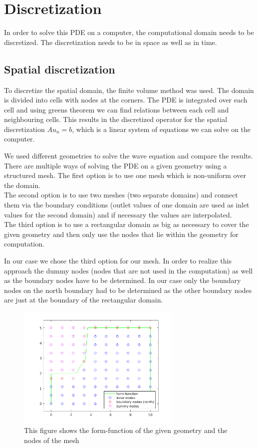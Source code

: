 \documentclass[fleqn,12pt]{NTFD} %
\begin{document}

\section{Discretization}
In order to solve this PDE on a computer, the computational domain needs to be discretized. The discretization needs to be in space as well as in time.
\subsection{Spatial discretization}
To discretize the spatial domain, the finite volume method was used. The domain is divided into cells with nodes at the corners. The PDE is integrated over each cell and using greens theorem we can find relations between each cell and neighbouring cells. This results in the discretized operator for the spatial discretization $Au_n=b$, which is a linear system of equations we can solve on the computer. 

We used different geometries to solve the wave equation and compare the results. There are multiple ways of solving the PDE on a given geometry using a structured mesh. The first option is to use one mesh which is non-uniform over the domain. \\
The second option is to use two meshes (two separate domains) and connect them via the boundary conditions (outlet values of one domain are used as inlet values for the second domain) and if necessary the values are interpolated. \\
The third option is to use a rectangular domain as big as necessary to cover the given geometry and then only use the nodes that lie within the geometry for computation. 

In our case we chose the third option for our mesh. In order to realize this approach the dummy nodes (nodes that are not used in the computation) as well as the boundary nodes have to be determined. In our case only the boundary nodes on the north boundary had to be determined as the other boundary nodes are just at the boundary of the rectangular domain. 

\begin{figure}
    \centering
    \includegraphics[width=0.7\textwidth]{mesh.png}
    \caption{This figure shows the form-function of the given geometry and the nodes of the mesh}
    \label{fig:mesh}
\end{figure}
\end{document}
